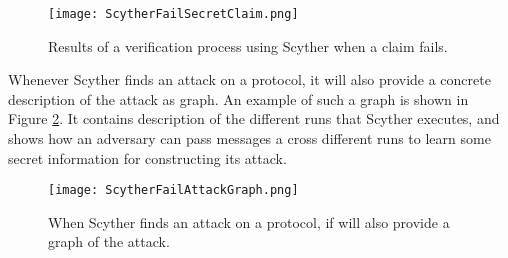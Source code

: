 \begin{figure}[h]
	\centering
	\texttt{[image: ScytherFailSecretClaim.png]}
	\caption{Results of a verification process using Scyther when a claim fails.}
	\label{fig:scyther-verify-claims-fail}
\end{figure}

Whenever Scyther finds an attack on a protocol, it will also provide a concrete description of the attack as graph. An example of such a graph is shown in Figure \ref{fig:scyther-graph}. It contains description of the different runs that Scyther executes, and shows how an adversary can pass messages a cross different runs to learn some secret information for constructing its attack.

\begin{figure}[h]
	\centering
	\texttt{[image: ScytherFailAttackGraph.png]}
	\caption{When Scyther finds an attack on a protocol, if will also provide a graph of the attack.}
	\label{fig:scyther-graph}
\end{figure}
